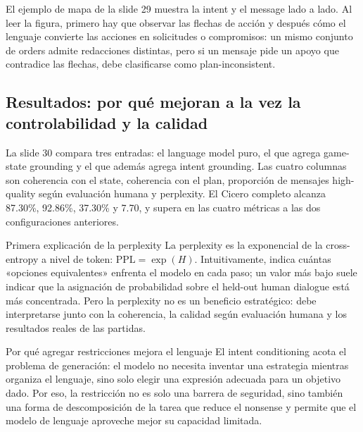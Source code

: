 El ejemplo de mapa de la slide 29 muestra la intent y el message lado a lado. Al leer la figura, primero hay que observar las flechas de acción y después cómo el lenguaje convierte las acciones en solicitudes o compromisos: un mismo conjunto de orders admite redacciones distintas, pero si un mensaje pide un apoyo que contradice las flechas, debe clasificarse como plan-inconsistent.


\subsection{Resultados: por qué mejoran a la vez la controlabilidad y la calidad}

La slide 30 compara tres entradas: el language model puro, el que agrega game-state grounding y el que además agrega intent grounding. Las cuatro columnas son coherencia con el state, coherencia con el plan, proporción de mensajes high-quality según evaluación humana y perplexity. El Cicero completo alcanza 87.30\%, 92.86\%, 37.30\% y 7.70, y supera en las cuatro métricas a las dos configuraciones anteriores.


\begin{knowledgebox}{Primera explicación de la perplexity}
La perplexity es la exponencial de la cross-entropy a nivel de token: $\mathrm{PPL}=\exp(H)$. Intuitivamente, indica cuántas «opciones equivalentes» enfrenta el modelo en cada paso; un valor más bajo suele indicar que la asignación de probabilidad sobre el held-out human dialogue está más concentrada. Pero la perplexity no es un beneficio estratégico: debe interpretarse junto con la coherencia, la calidad según evaluación humana y los resultados reales de las partidas.
\end{knowledgebox}

\begin{importantbox}{Por qué agregar restricciones mejora el lenguaje}
El intent conditioning acota el problema de generación: el modelo no necesita inventar una estrategia mientras organiza el lenguaje, sino solo elegir una expresión adecuada para un objetivo dado. Por eso, la restricción no es solo una barrera de seguridad, sino también una forma de descomposición de la tarea que reduce el nonsense y permite que el modelo de lenguaje aproveche mejor su capacidad limitada.
\end{importantbox}

